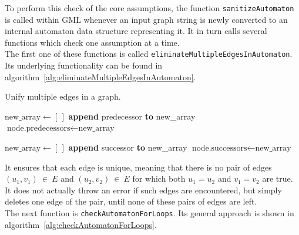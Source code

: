 \documentclass[a4paper,12pt,twoside,BCOR=10mm]{scrbook}
\begin{document}
To perform this check of the core assumptions, the function \texttt{sanitizeAutomaton} is called within GML 
whenever an input graph string is newly converted to an internal automaton data structure representing it. 
It in turn calls several functions which check one assumption at a time. \\
The first one of these functions is called \texttt{eliminateMultipleEdgesInAutomaton}. 
Its underlying functionality can be found in algorithm~\ref{alg:eliminateMultipleEdgesInAutomaton}.
\begin{algorithm}
\caption[Unify multiple edges in a graph]{Unify multiple edges in a graph.}
\label{alg:eliminateMultipleEdgesInAutomaton}
\begin{algorithmic}[1]
		\State $ \textrm{new\_array} \gets [ \, ] $
				\State \textbf{append} predecessor \textbf{to} new\_array
			\EndIf
		\EndFor
		\State $ \textrm{node.predecessors} \gets \textrm{new\_array} $
	\EndIf
	
		\State $ \textrm{new\_array} \gets [ \, ] $
				\State \textbf{append} successor \textbf{to} new\_array
			\EndIf
		\EndFor
		\State $ \textrm{node.successors} \gets \textrm{new\_array} $
	\EndIf
\EndFor
\end{algorithmic}
\end{algorithm}
It ensures that each edge is unique, meaning that there is no pair of 
edges $ (u_1, v_1) {\: \in \:} E $ and $ (u_2, v_2) {\: \in \:} E $ for which both $ u_1 = u_2 $ and $ v_1 = v_2 $ are true. 
It does not actually throw an error if such edges are encountered, but simply deletes one edge of the pair, until none 
of these pairs of edges are left. \\
The next function is \texttt{checkAutomatonForLoops}. 
Its general approach is shown in algorithm~\ref{alg:checkAutomatonForLoops}.
\end{document}
